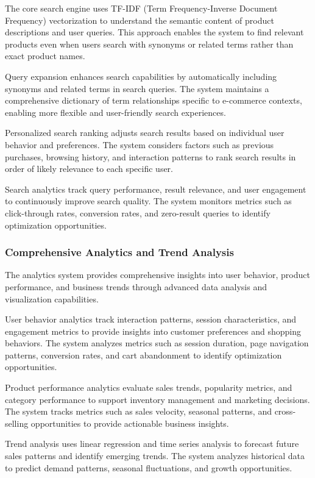 \documentclass[12pt]{article}
\begin{document}
The core search engine uses TF-IDF (Term Frequency-Inverse Document Frequency) vectorization to understand the semantic content of product descriptions and user queries. This approach enables the system to find relevant products even when users search with synonyms or related terms rather than exact product names.

Query expansion enhances search capabilities by automatically including synonyms and related terms in search queries. The system maintains a comprehensive dictionary of term relationships specific to e-commerce contexts, enabling more flexible and user-friendly search experiences.

Personalized search ranking adjusts search results based on individual user behavior and preferences. The system considers factors such as previous purchases, browsing history, and interaction patterns to rank search results in order of likely relevance to each specific user.

Search analytics track query performance, result relevance, and user engagement to continuously improve search quality. The system monitors metrics such as click-through rates, conversion rates, and zero-result queries to identify optimization opportunities.

\subsubsection{Comprehensive Analytics and Trend Analysis}
The analytics system provides comprehensive insights into user behavior, product performance, and business trends through advanced data analysis and visualization capabilities.

User behavior analytics track interaction patterns, session characteristics, and engagement metrics to provide insights into customer preferences and shopping behaviors. The system analyzes metrics such as session duration, page navigation patterns, conversion rates, and cart abandonment to identify optimization opportunities.

Product performance analytics evaluate sales trends, popularity metrics, and category performance to support inventory management and marketing decisions. The system tracks metrics such as sales velocity, seasonal patterns, and cross-selling opportunities to provide actionable business insights.

Trend analysis uses linear regression and time series analysis to forecast future sales patterns and identify emerging trends. The system analyzes historical data to predict demand patterns, seasonal fluctuations, and growth opportunities.
\end{document}
